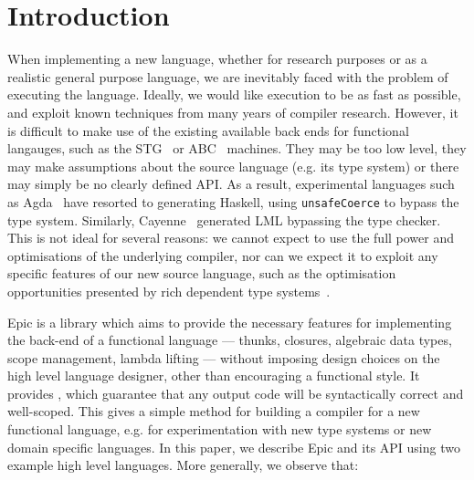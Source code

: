 \section{Introduction}

When implementing a new language, whether for research purposes or as
a realistic general purpose language, we are inevitably faced with the
problem of executing the language. Ideally, we would like execution to
be as fast as possible, and exploit known techniques from many years
of compiler research. However, it is difficult to make use of the
existing available back ends for functional langauges, such as the
STG~\cite{evalpush,stg,llvm-haskell} or ABC~\cite{abc-machine}
machines. They may be too low level, they may make assumptions about
the source language (e.g. its type system) or there may simply be no
clearly defined API. As a result, experimental languages such as
Agda~\cite{norell-thesis} have resorted to generating Haskell, using
\texttt{unsafeCoerce} to bypass the type system. Similarly,
Cayenne~\cite{cayenne-icfp} generated LML bypassing the type
checker. This is not ideal for several reasons: we cannot expect to
use the full power and optimisations of the underlying compiler, nor
can we expect it to exploit any specific features of our new source
language, such as the optimisation opportunities presented by rich
dependent type systems~\cite{brady-thesis}.

Epic is a library which aims to provide the necessary features for
implementing the back-end of a functional language --- thunks,
closures, algebraic data types, scope management, lambda lifting ---
without imposing  design choices on the high level language
designer, other than encouraging a functional style. It
provides , which guarantee that any output
code will be syntactically correct and well-scoped.  This gives a
simple method for building a compiler for a new functional language,
e.g. for experimentation with new type systems or new domain specific
languages. In this paper, we describe Epic and its API using two
example high level languages. More generally, we observe that:

